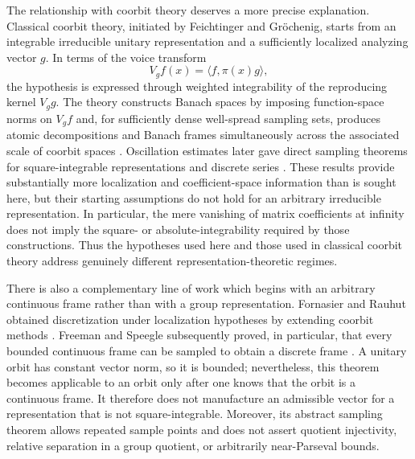 \documentclass[reqno]{amsart}
\numberwithin{equation}{section}
\theoremstyle{definition}
\theoremstyle{remark}
\begin{document}
The relationship with coorbit theory deserves a more precise explanation.
Classical coorbit theory, initiated by Feichtinger and Gr\"ochenig, starts
from an integrable irreducible unitary representation and a sufficiently
localized analyzing vector $g$.  In terms of the voice transform
\[
   V_gf(x)=\langle f,\pi(x)g\rangle,
\]
the hypothesis is expressed through weighted integrability of the reproducing
kernel $V_gg$.  The theory constructs Banach spaces by imposing function-space
norms on $V_gf$ and, for sufficiently dense well-spread sampling sets,
produces atomic decompositions and Banach frames simultaneously across the
associated scale of coorbit spaces
\cite{FeichtingerGrochenig1988,FeichtingerGrochenig1989I,
FeichtingerGrochenig1989II}.  Oscillation estimates later gave direct sampling
theorems for square-integrable representations and discrete series
\cite{FuehrGrochenig2007}.  These results provide substantially more
localization and coefficient-space information than is sought here, but their
starting assumptions do not hold for an arbitrary irreducible representation.
In particular, the mere vanishing of matrix coefficients at infinity does
not imply the square- or absolute-integrability required by those
constructions.  Thus the hypotheses used here and those used in classical
coorbit theory address genuinely different representation-theoretic regimes.

There is also a complementary line of work which begins with an arbitrary
continuous frame rather than with a group representation.  Fornasier and
Rauhut obtained discretization
under localization hypotheses by extending coorbit methods
\cite{FornasierRauhut2005}.  Freeman and Speegle subsequently proved, in
particular, that every bounded continuous frame can be sampled to obtain a
discrete frame \cite{FreemanSpeegle2019}.  A unitary orbit has constant vector
norm, so it is bounded; nevertheless, this theorem becomes applicable to an
orbit only after one knows that the orbit is a continuous frame.  It therefore
does not manufacture an admissible vector for a representation that is not
square-integrable.  Moreover, its abstract sampling theorem allows repeated
sample points and does not assert quotient injectivity, relative separation
in a group quotient, or arbitrarily near-Parseval bounds.
\end{document}
